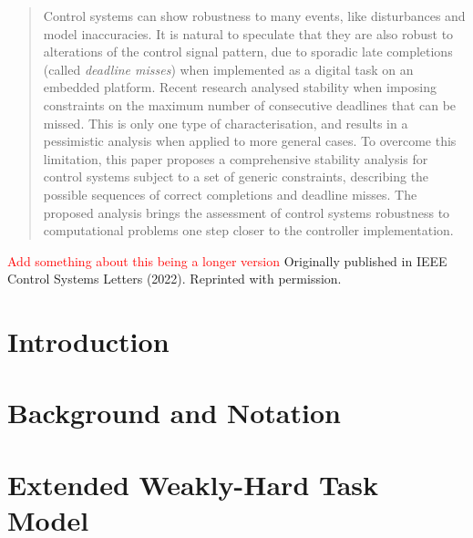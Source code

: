 \renewcommand\thisdir{papers/lcss22}
\renewcommand\figdir{\thisdir/figs}




\begin{abstract}
    Control systems can show robustness to many events, like disturbances and model inaccuracies.
    It is natural to speculate that they are also robust to alterations of the control signal pattern, due to sporadic late completions (called \emph{deadline misses}) when implemented as a digital task on an embedded platform.
    Recent research analysed stability when imposing constraints on the maximum number of consecutive deadlines that can be missed.
    This is only one type of characterisation, and results in a pessimistic analysis when applied to more general cases.
    To overcome this limitation, this paper proposes a comprehensive stability analysis for control systems subject to a set of generic constraints, describing the possible sequences  of correct completions and deadline misses.
    The proposed analysis brings the assessment of control systems robustness to computational problems one step closer to the controller implementation.
\end{abstract}

\vfill
\textcolor{red}{Add something about this being a longer version}
Originally published in IEEE Control Systems Letters (2022). 
Reprinted with permission.
\newpage

\section{Introduction}
\label{sec:intro}


\section{Background and Notation}
\label{sec:background}


\section{Extended Weakly-Hard Task Model}
\label{sec:model}



